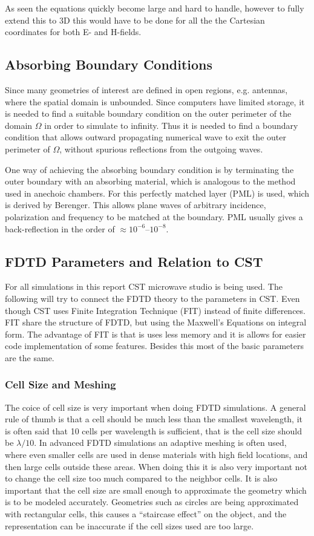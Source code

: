 As seen the equations quickly become large and hard to handle, however to fully extend this to 3D this would have to be done for all the the Cartesian coordinates for both E- and H-fields. 

\subsection{Absorbing Boundary Conditions}
Since many geometries of interest are defined in open regions, e.g. antennas, where the spatial domain is unbounded. Since computers have limited storage, it is needed to find a suitable boundary condition on the outer perimeter of the domain $\Omega$ in order to simulate to infinity. Thus it is needed to find a boundary condition that allows outward propagating numerical wave to exit the outer perimeter of $\Omega$, without spurious reflections from the outgoing waves. 

One way of achieving the absorbing boundary condition is by terminating the outer boundary with an absorbing material, which is analogous to the method used in anechoic chambers. For this perfectly matched layer (PML) is used, which is derived by Berenger. This allows plane waves of arbitrary incidence, polarization and frequency to be matched at the boundary. PML usually gives a back-reflection in the order of $\approx 10^{-6}$--$10^{-8}$.\cite{taflove2000computional}

\subsection{FDTD Parameters and Relation to CST}
For all simulations in this report CST microwave studio is being used. The following will try to connect the FDTD theory to the parameters in CST. Even though CST uses Finite Integration Technique (FIT) instead of finite differences. FIT share the structure of FDTD, but using the Maxwell's Equations on integral form. The advantage of FIT is that is uses less memory and it is allows for easier code implementation of some features. Besides this most of the basic parameters are the same. 

\subsubsection{Cell Size and Meshing}
The coice of cell size is very important when doing FDTD simulations. A general rule of thumb is that a cell should be much less than the smallest wavelength, it is often said that 10 cells per wavelength is sufficient, that is the cell size should be $\lambda/10$. In advanced FDTD simulations an adaptive meshing is often used, where even smaller cells are used in dense materials with high field locations, and then large cells outside these areas. When doing this it is also very important not to change the cell size too much compared to the neighbor cells. It is also important
that the cell size are small enough to approximate the geometry which is to be modeled accurately. Geometries such as circles are being approximated with rectangular cells, this causes a ``staircase effect'' on the object, and the representation can be inaccurate if the cell sizes used are too large. 

